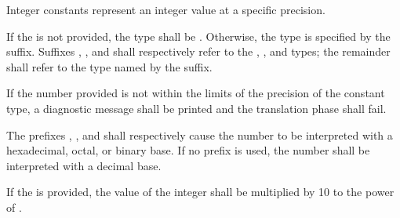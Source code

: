 
Integer constants represent an integer value at a specific precision.

\specsubitem
If the  is not provided, the type shall be
.  Otherwise, the type is specified by the suffix. Suffixes
, ,  and  shall respectively refer to the
, , and  types; the remainder shall
refer to the type named by the suffix.

\specsubitem
If the number provided is not within the limits of the precision of the
constant type, a diagnostic message shall be printed and the translation phase
shall fail.

\specsubitem
The prefixes , , and  shall respectively
cause the number to be interpreted with a hexadecimal, octal, or binary base.
If no prefix is used, the number shall be interpreted with a decimal base.

\specsubitem
If the  is provided, the value of the
integer shall be multiplied by 10 to the power of .

\begin{grammar}
 \\
	   \\

 \\
	 \\
	 \\

 \\
	 \\
	   \\
	     \\

 \oneof \\
	\terminal{\textbackslash\textbackslash}
	 \\
\end{grammar}

